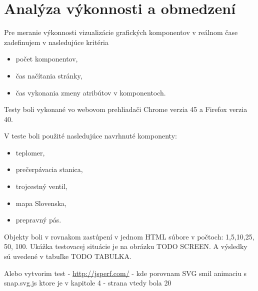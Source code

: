 \chapter{Analýza výkonnosti a obmedzení }
Pre meranie výkonnosti vizualizácie grafických komponentov v reálnom čase zadefinujem v nasledujúce kritéria
\begin{itemize}
	\item počet komponentov, 
	\item čas načítania stránky, 
	\item čas vykonania zmeny atribútov v komponentoch.
\end{itemize}

Testy boli vykonané vo webovom prehliadači Chrome verzia 45 a Firefox verzia 40.  

V teste boli použité nasledujúce navrhnuté komponenty:
\begin{itemize}
	\item teplomer, 
	\item prečerpávacia stanica, 
	\item trojcestný ventil, 
	\item mapa Slovenska, 
	\item prepravný pás. 
\end{itemize}

Objekty boli v rovnakom zastúpení v jednom HTML súbore  v počtoch: 1,5,10,25, 50, 100.
Ukážka testovacej situácie je na obrázku TODO SCREEN. 
A výsledky sú uvedené v tabuľke TODO TABULKA. 


\newpage
Alebo vytvorim test -
\url{http://jsperf.com/}
- kde porovnam SVG smil animaciu s snap.svg.js
ktore je v kapitole 4 - strana vtedy bola 20

